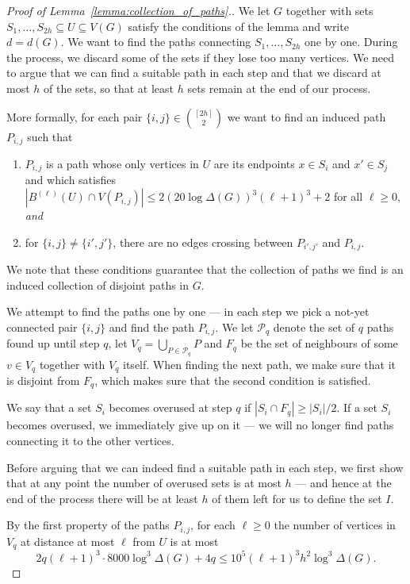 \documentclass[10pt,a4paper]{amsart}
\begin{document}
\begin{proof}[Proof of Lemma~\ref{lemma:collection_of_paths}.]
    We let $G$ together with sets $S_1, \dots, S_{2h} \subseteq U \subseteq V(G)$ satisfy the conditions of the lemma and write $d = d(G)$.
    We want to find the paths connecting $S_1, \dots, S_{2h}$ one by one.
    During the process, we discard some of the sets if they lose too many vertices.
    We need to argue that we can find a suitable path in each step and that we discard at most $h$ of the sets, so that at least $h$ sets remain at the end of our process.

    More formally, for each pair $\{i, j\} \in \binom{[2h]}{2}$ we want to find an induced path $P_{i,j}$ such that
    \begin{enumerate}
        \item $P_{i, j}$ is a path whose only vertices in $U$ are its endpoints $x \in S_i$ and $x' \in S_j$ and which satisfies $|B^{(\ell)}(U)\cap V(P_{i, j})|\leq 2(20\log \Delta(G))^3 (\ell+1)^3+2$ for all $\ell\geq 0$, \emph{and}
        \item for $\{i, j\} \neq \{i', j'\}$, there are no edges crossing between $P_{i', j'}$ and $P_{i, j}$.
    \end{enumerate}
    We note that these conditions guarantee that the collection of paths we find is an induced collection of disjoint paths in $G$.

    We attempt to find the paths one by one --- in each step we pick a not-yet connected pair $\{i, j\}$ and find the path $P_{i, j}$.
    We let $\mathcal{P}_q$ denote the set of $q$ paths found up until step $q$, let $V_q = \bigcup_{P \in \mathcal{P}_q} P$ and $F_q$ be the set of neighbours of some $v\in V_q$ together with $V_q$ itself. When finding the next path, we make sure that it is disjoint from $F_q$, which makes sure that the second condition is satisfied.

    We say that a set $S_i$ becomes overused at step $q$ if $|S_i \cap F_q| \geq |S_i|/2$. If a set $S_i$ becomes overused, we immediately give up on it --- we will no longer find paths connecting it to the other vertices.

    Before arguing that we can indeed find a suitable path in each step, we first show that at any point the number of overused sets is at most $h$ --- and hence at the end of the process there will be at least $h$ of them left for us to define the set $I$.

    By the first property of the paths $P_{i, j}$, for each $\ell \geq 0$ the number of vertices in $V_q$ at distance at most $\ell$ from $U$ is at most
    \[
        2q(\ell+1)^3  \cdot 8000\log^3\Delta(G)  + 4q \leq 10^5(\ell+1)^3h^2\log^3\Delta(G).
    \]
    

\end{proof}
\end{document}

